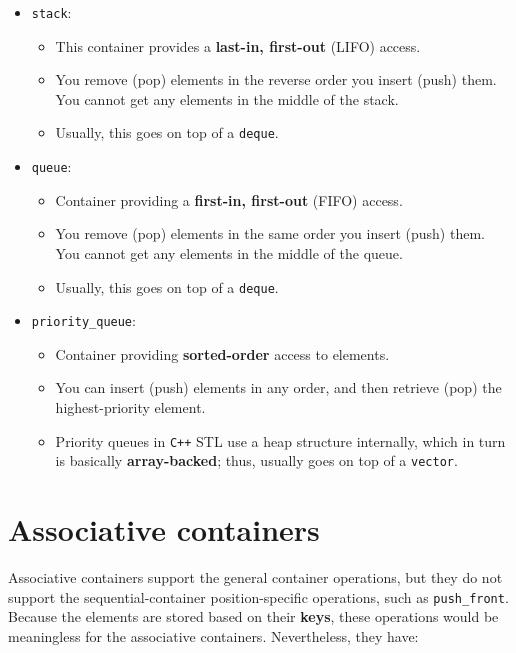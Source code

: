 \begin{itemize}
    \item \texttt{stack}:
    \begin{itemize}
        \item This container provides a \textbf{last-in, first-out} (LIFO) access.
        \item You remove (pop) elements in the reverse order you insert (push) them.
        You cannot get any elements in the middle of the stack.
        \item Usually, this goes on top of a \texttt{deque}.
    \end{itemize}

    \item \texttt{queue}:
    \begin{itemize}
        \item Container providing a \textbf{first-in, first-out} (FIFO) access.
        \item You remove (pop) elements in the same order you insert (push) them.
        You cannot get any elements in the middle of the queue.
        \item Usually, this goes on top of a \texttt{deque}.
    \end{itemize}

    \item \texttt{priority\_queue}:
    \begin{itemize}
        \item Container providing \textbf{sorted-order} access to elements.
        \item You can insert (push) elements in any order, and then retrieve (pop) the 
        highest-priority element.
        \item Priority queues in \texttt{C++} STL use a heap structure internally, which in
        turn is basically \textbf{array-backed}; thus, usually goes on top of a \texttt{vector}.
    \end{itemize}
\end{itemize}

\section{Associative containers}

Associative containers support the general container operations, but they do not support
the sequential-container position-specific operations, such as \texttt{push\_front}. Because 
the elements are stored based on their \textbf{keys}, these operations would be meaningless for
the associative containers. Nevertheless, they have:

